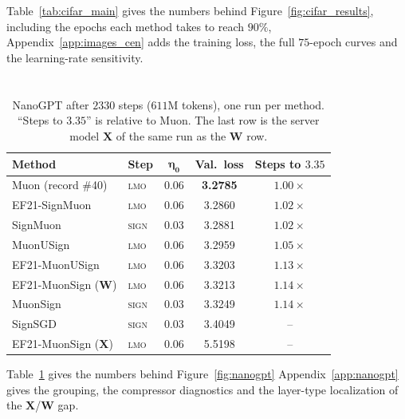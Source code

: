 Table~\ref{tab:cifar_main} gives the numbers behind Figure~\ref{fig:cifar_results}, including the epochs each method takes to reach $90\%$,  Appendix~\ref{app:images_cen} adds the training loss, the full $75$-epoch curves and the learning-rate sensitivity.

\section{}\label{app:opt:nanogpt}

\begin{table}[!tb]
\centering\footnotesize
\setlength{\tabcolsep}{4pt}
\begin{tabular}{@{}llccc@{}}
\toprule
\textbf{Method} & \textbf{Step} & $\boldsymbol{\eta_0}$ & \textbf{Val.\ loss} & \textbf{Steps to $3.35$} \\
\midrule
Muon (record \#40)   & \textsc{lmo}  & 0.06 & \textbf{3.2785} & $1.00\times$ \\
EF21-SignMuon        & \textsc{lmo}  & 0.06 & 3.2860 & $1.02\times$ \\
SignMuon             & \textsc{sign} & 0.03 & 3.2881 & $1.02\times$ \\
MuonUSign            & \textsc{lmo}  & 0.06 & 3.2959 & $1.05\times$ \\
EF21-MuonUSign       & \textsc{lmo}  & 0.06 & 3.3203 & $1.13\times$ \\
EF21-MuonSign ($\mathbf{W}$) & \textsc{lmo} & 0.06 & 3.3213 & $1.14\times$ \\
MuonSign             & \textsc{sign} & 0.03 & 3.3249 & $1.14\times$ \\
SignSGD              & \textsc{sign} & 0.03 & 3.4049 & -- \\
\midrule
EF21-MuonSign ($\mathbf{X}$) & \textsc{lmo} & 0.06 & 5.5198 & -- \\
\bottomrule
\end{tabular}
\caption{NanoGPT after $2330$ steps ($611$M tokens), one run per method. ``Steps to $3.35$'' is relative to Muon. The last row is the server model $\mathbf{X}$ of the same run as the $\mathbf{W}$ row.}
\label{tab:nanogpt}
\end{table}


Table~\ref{tab:nanogpt} gives the numbers behind Figure~\ref{fig:nanogpt} Appendix~\ref{app:nanogpt} gives the grouping, the compressor diagnostics and the layer-type localization of the $\mathbf{X}$/$\mathbf{W}$ gap.
